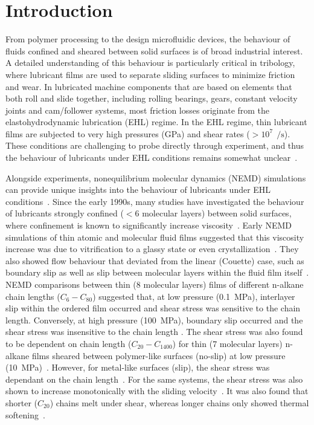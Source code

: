 \documentclass[5p]{elsarticle}
\begin{document}
\section{Introduction}

From polymer processing to the design microfluidic devices, the behaviour of fluids confined and sheared between solid surfaces is of broad industrial interest. A detailed understanding of this behaviour is particularly critical in tribology, where lubricant films are used to separate sliding surfaces to minimize friction and wear. In lubricated machine components that are based on elements that both roll and slide together, including rolling bearings, gears, constant velocity joints and cam/follower systems, most friction losses originate from the elastohydrodynamic lubrication (EHL) regime. In the EHL regime, thin lubricant films are subjected to very high pressures (GPa) and shear rates ($> 10^{7}~\SI{}{\per\second}$). These conditions are challenging to probe directly through experiment, and thus the behaviour of lubricants under EHL conditions remains somewhat unclear~\cite{Spikes2014}.

Alongside experiments, nonequilibrium molecular dynamics (NEMD) simulations can provide unique insights into the behaviour of lubricants under EHL conditions~\cite{Ewen2018}. Since the early 1990s, many studies have investigated the behaviour of lubricants strongly confined ($< 6$ molecular layers) between solid surfaces, where confinement is known to significantly increase viscosity~\cite{Granick1991}. Early NEMD simulations of thin atomic and molecular fluid films suggested that this viscosity increase was due to vitrification to a glassy state or even crystallization~\cite{Thompson1992}. They also showed flow behaviour that deviated from the linear (Couette) case, such as boundary slip as well as slip between molecular layers within the fluid film itself~\cite{Thompson1990}. NEMD comparisons between thin (8 molecular layers) films of different n-alkane chain lengths ($C_6 - C_{80}$) suggested that, at low pressure (\SI{0.1}{\mega\pascal}), interlayer slip within the ordered film occurred and shear stress was sensitive to the chain length. Conversely, at high pressure (\SI{100}{\mega\pascal}), boundary slip occurred and the shear stress was insensitive to the chain length \cite{Koike1998}. The shear stress was also found to be dependent on chain length ($C_{20} - C_{1400}$) for thin (7 molecular layers) n-alkane films sheared between polymer-like surfaces (no-slip) at low pressure (\SI{10}{\mega\pascal})~\cite{Sivebaek2008}. However, for metal-like surfaces (slip), the shear stress was dependant on the chain length~\cite{Sivebaek2008}. For the same systems, the shear stress was also shown to increase monotonically with the sliding velocity~\cite{Sivebaek2010}. It was also found that shorter ($C_{20}$) chains melt under shear, whereas longer chains only showed thermal softening~\cite{Sivebaek2012}.
\end{document}
